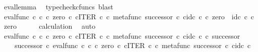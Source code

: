 \begin{isabellebody}
\ eval{\isacharunderscore}{\kern0pt}lemma\ \isamarkupfalse%
\ {\isacharparenleft}{\kern0pt}typecheck{\isacharunderscore}{\kern0pt}cfuncs{\isacharcomma}{\kern0pt}\ blast{\isacharparenright}{\kern0pt}\isanewline
\ \ \isamarkupfalse%
\ \isamarkupfalse%
\ {\isachardoublequoteopen}{\isacharparenleft}{\kern0pt}eval{\isacharunderscore}{\kern0pt}func\ {\isasymnat}\isactrlsub c\ {\isasymnat}\isactrlsub c\ {\isasymcirc}\isactrlsub c\ {\isasymlangle}zero\ {\isasymcirc}\isactrlsub c\ {\isasymbeta}\isactrlbsub {\isasymnat}\isactrlsub c\isactrlesub {\isacharcomma}{\kern0pt}ITER\ {\isasymnat}\isactrlsub c\ {\isasymcirc}\isactrlsub c\ {\isasymlangle}metafunc\ successor\ {\isasymcirc}\isactrlsub c\ {\isasymbeta}\isactrlbsub {\isasymnat}\isactrlsub c\isactrlesub {\isacharcomma}{\kern0pt}id\isactrlsub c\ {\isasymnat}\isactrlsub c{\isasymrangle}{\isasymrangle}{\isacharparenright}{\kern0pt}\ {\isasymcirc}\isactrlsub c\ zero\ {\isacharequal}{\kern0pt}\ id\isactrlsub c\ {\isasymnat}\isactrlsub c\ {\isasymcirc}\isactrlsub c\ zero{\isachardoublequoteclose}\isanewline
\ \ \ \ \isamarkupfalse%
\ calculation\ \isamarkupfalse%
\ auto\isanewline
\ \ \isamarkupfalse%
\ {\isachardoublequoteopen}{\isacharparenleft}{\kern0pt}eval{\isacharunderscore}{\kern0pt}func\ {\isasymnat}\isactrlsub c\ {\isasymnat}\isactrlsub c\ {\isasymcirc}\isactrlsub c\ {\isasymlangle}zero\ {\isasymcirc}\isactrlsub c\ {\isasymbeta}\isactrlbsub {\isasymnat}\isactrlsub c\isactrlesub {\isacharcomma}{\kern0pt}ITER\ {\isasymnat}\isactrlsub c\ {\isasymcirc}\isactrlsub c\ {\isasymlangle}metafunc\ successor\ {\isasymcirc}\isactrlsub c\ {\isasymbeta}\isactrlbsub {\isasymnat}\isactrlsub c\isactrlesub {\isacharcomma}{\kern0pt}id\isactrlsub c\ {\isasymnat}\isactrlsub c{\isasymrangle}{\isasymrangle}{\isacharparenright}{\kern0pt}\ {\isasymcirc}\isactrlsub c\ successor\ {\isacharequal}{\kern0pt}\isanewline
\ \ \ \ successor\ {\isasymcirc}\isactrlsub c\ eval{\isacharunderscore}{\kern0pt}func\ {\isasymnat}\isactrlsub c\ {\isasymnat}\isactrlsub c\ {\isasymcirc}\isactrlsub c\ {\isasymlangle}zero\ {\isasymcirc}\isactrlsub c\ {\isasymbeta}\isactrlbsub {\isasymnat}\isactrlsub c\isactrlesub {\isacharcomma}{\kern0pt}ITER\ {\isasymnat}\isactrlsub c\ {\isasymcirc}\isactrlsub c\ {\isasymlangle}metafunc\ successor\ {\isasymcirc}\isactrlsub c\ {\isasymbeta}\isactrlbsub {\isasymnat}\isactrlsub c\isactrlesub {\isacharcomma}{\kern0pt}id\isactrlsub c\ {\isasymnat}\isactrlsub c{\isasymrangle}{\isasymrangle}{\isachardoublequoteclose}\isanewline
\ \ \isamarkupfalse%

\end{isabellebody}
